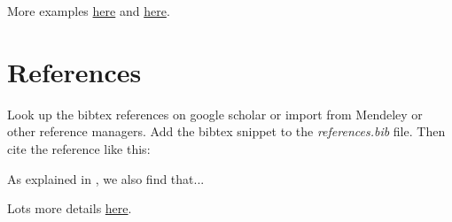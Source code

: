 More examples \href{https://www.latex-tutorial.com/tutorials/amsmath/}{here} and \href{https://www.overleaf.com/learn/latex/Mathematical_expressions}{here}.



\section{References}
Look up the bibtex references on google scholar or import from Mendeley or other reference managers. Add the bibtex snippet to the \emph{references.bib} file. Then cite the reference like this:

As explained in \cite{knuth2014art}, we also find that...

Lots more details \href{https://www.latex-tutorial.com/tutorials/bibtex/}{here}.